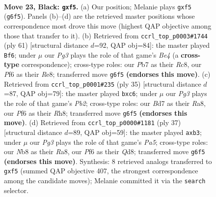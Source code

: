 \documentclass[11pt]{article}
\begin{document}
\clearpage

\begin{figure}[p]\centering
\begin{subfigure}{0.46\textwidth}\centering
\resizebox{\linewidth}{!}{%
\newchessgame
\chessboard[
  setfen={rnr5/pppbb1k1/q4pp1/P2p1P2/1P1P3N/4P1P1/3Q4/RNB2RK1 b - - 0 23},
  showmover=false,
  pgfstyle=straightmove, color=movearrow, markmove={g6-f5}
]}
\caption{}
\end{subfigure}\hfill
\begin{subfigure}{0.46\textwidth}\centering
\resizebox{\linewidth}{!}{%
\newchessgame
\chessboard[
  setfen={2r1r1k1/p2p1ppp/1p1q3n/3Pb3/2P5/P2B1NP1/KP2R2P/3Q1R2 b - - 0 31},
  showmover=false,
  pgfstyle=straightmove, color=movearrow, markmove={e5-f6}
]}
\caption{}
\end{subfigure}
\\[4pt]
\begin{subfigure}{0.46\textwidth}\centering
\resizebox{\linewidth}{!}{%
\newchessgame
\chessboard[
  setfen={r3k2r/pp2bp2/1nP1bq2/3p2pp/3P4/PNNBP1P1/2Q2PP1/R3K2R b KQkq - 0 18},
  showmover=false,
  pgfstyle=straightmove, color=movearrow, markmove={b7-c6}
]}
\caption{}
\end{subfigure}\hfill
\begin{subfigure}{0.46\textwidth}\centering
\resizebox{\linewidth}{!}{%
\newchessgame
\chessboard[
  setfen={r2q1r1k/1ppn1p1p/3p2pP/3b4/p4P2/1P2PPN1/P1P1B3/1RQ1K2R b K - 0 19},
  showmover=false,
  pgfstyle=straightmove, color=movearrow, markmove={a4-b3}
]}
\caption{}
\end{subfigure}
\caption{\textbf{Move 23, Black: \texttt{gxf5}.} (a) Our position; Melanie plays \texttt{gxf5} (\texttt{g6f5}). Panels (b)--(d) are the retrieved master positions whose correspondence most drove this move (highest QAP objective among those that transfer to it). (b) Retrieved from \texttt{ccrl\_top\_p0003\#1744} (ply 61) [structural distance $d$=92, QAP obj=84]: the master played \texttt{Bf6}; under $\mu$ our \emph{Pg3} plays the role of that game's \emph{Be4} (a \textbf{cross-type} correspondence); cross-type roles: our \emph{P}b7 as their \emph{R}c8, our \emph{P}f6 as their \emph{R}e8; transferred move \texttt{g6f5} \textbf{(endorses this move)}. (c) Retrieved from \texttt{ccrl\_top\_p0001\#235} (ply 35) [structural distance $d$=87, QAP obj=79]: the master played \texttt{bxc6}; under $\mu$ our \emph{Pg3} plays the role of that game's \emph{Pb2}; cross-type roles: our \emph{B}d7 as their \emph{R}a8, our \emph{P}f6 as their \emph{R}h8; transferred move \texttt{g6f5} \textbf{(endorses this move)}. (d) Retrieved from \texttt{ccrl\_top\_p0000\#1181} (ply 37) [structural distance $d$=89, QAP obj=59]: the master played \texttt{axb3}; under $\mu$ our \emph{Pg3} plays the role of that game's \emph{Pa5}; cross-type roles: our \emph{N}b8 as their \emph{R}a8, our \emph{P}f6 as their \emph{Q}d8; transferred move \texttt{g6f5} \textbf{(endorses this move)}. Synthesis: 8 retrieved analogs transferred to \texttt{gxf5} (summed QAP objective 407, the strongest correspondence among the candidate moves); Melanie committed it via the \texttt{search} selector.}
\label{fig:thought-m45}
\end{figure}
\end{document}
